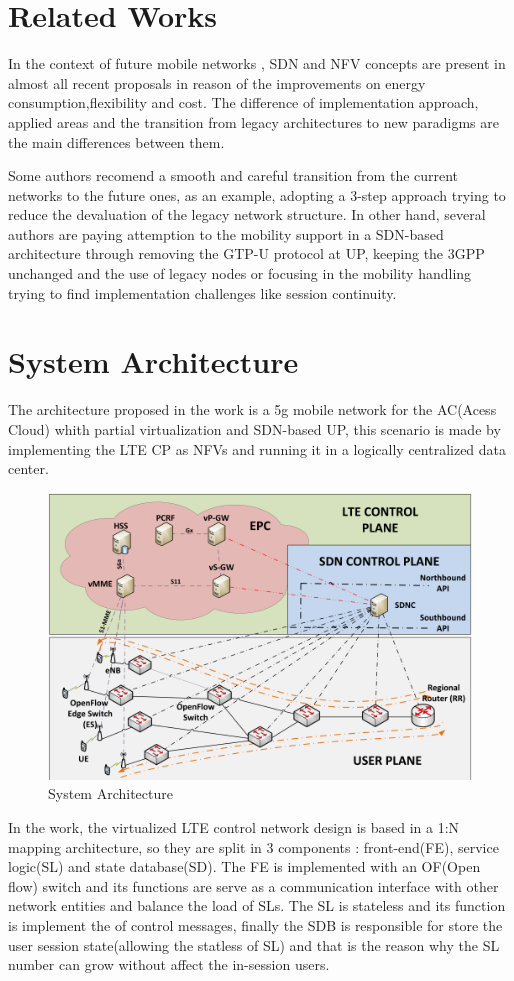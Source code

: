 \documentclass[12pt]{article}
\begin{document}
\section{Related Works}

In the context of future mobile networks , SDN and NFV concepts are present in almost all recent proposals in reason of the improvements on energy consumption,flexibility and cost. The difference of implementation approach, applied areas and the transition from legacy architectures to new paradigms are the main differences between them.

Some authors recomend a smooth and careful transition from the current networks to the future ones, as an example, adopting a 3-step approach trying to reduce the devaluation of the legacy network structure. In other hand, several authors are paying attemption to the mobility support in a SDN-based architecture through removing the  GTP-U protocol at UP, keeping the 3GPP unchanged and the use of legacy nodes or focusing in the mobility handling trying to find implementation challenges like session continuity. 


\section{System Architecture}

The architecture proposed in the work is a 5g mobile network for the AC(Acess Cloud) whith partial virtualization and SDN-based UP, this scenario is made by implementing the LTE CP as NFVs and running it in a logically centralized data center.

\begin{figure}[ht]
\centering
\includegraphics[width=.7\textwidth]{figurejamelly.png}
\caption{System Architecture}
\label{figure 4: System Architecture}
\end{figure}

In the work, the virtualized LTE control network design is based in a 1:N mapping architecture, so they are split in 3 components : front-end(FE), service logic(SL) and state database(SD). The FE is implemented with an OF(Open flow)	switch and its functions are serve as a communication interface with other network entities and balance the load of SLs. The SL is stateless and its function is implement the of control messages, finally the SDB is responsible for store the user session state(allowing the statless of SL) and that is the reason why the SL number can grow without affect the in-session users.
\end{document}
